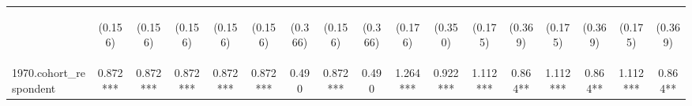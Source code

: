 \begin{center}
\begin{tabular}{lcccccccccccccccc}
\vspace{4pt} & \begin{footnotesize}(0.156)\end{footnotesize} & \begin{footnotesize}(0.156)\end{footnotesize} & \begin{footnotesize}(0.156)\end{footnotesize} & \begin{footnotesize}(0.156)\end{footnotesize} & \begin{footnotesize}(0.156)\end{footnotesize} & \begin{footnotesize}(0.366)\end{footnotesize} & \begin{footnotesize}(0.156)\end{footnotesize} & \begin{footnotesize}(0.366)\end{footnotesize} & \begin{footnotesize}(0.176)\end{footnotesize} & \begin{footnotesize}(0.350)\end{footnotesize} & \begin{footnotesize}(0.175)\end{footnotesize} & \begin{footnotesize}(0.369)\end{footnotesize} & \begin{footnotesize}(0.175)\end{footnotesize} & \begin{footnotesize}(0.369)\end{footnotesize} & \begin{footnotesize}(0.175)\end{footnotesize} & \begin{footnotesize}(0.369)\end{footnotesize} \\
1970.cohort\_respondent & 0.872*** & 0.872*** & 0.872*** & 0.872*** & 0.872*** & 0.490 & 0.872*** & 0.490 & 1.264*** & 0.922*** & 1.112*** & 0.864** & 1.112*** & 0.864** & 1.112*** & 0.864** \\

\end{tabular}
\end{center}
